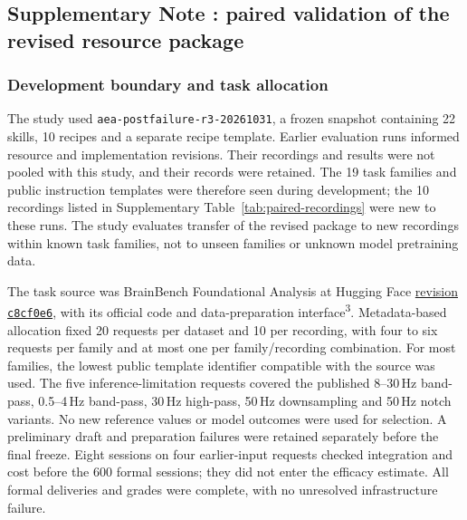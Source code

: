 \FloatBarrier
{}
\subsection*{Supplementary Note \thesuppnote: paired validation of the revised resource package}
\label{si:paired-validation}

\subsubsection*{Development boundary and task allocation}

The study used \texttt{aea-postfailure-r3-20261031}, a frozen snapshot containing 22 skills, 10 recipes and a separate recipe template. Earlier evaluation runs informed resource and implementation revisions. Their recordings and results were not pooled with this study, and their records were retained. The 19 task families and public instruction templates were therefore seen during development; the 10 recordings listed in Supplementary Table~\ref*{tab:paired-recordings} were new to these runs. The study evaluates transfer of the revised package to new recordings within known task families, not to unseen families or unknown model pretraining data.

The task source was BrainBench Foundational Analysis at Hugging Face \href{https://huggingface.co/datasets/xbb083/BrainBench/tree/c8cf0e6fc549d832e0d2de11f6e831b7bcb753a3}{revision \texttt{c8cf0e6}}, with its official code and data-preparation interface\textsuperscript{3}. Metadata-based allocation fixed 20 requests per dataset and 10 per recording, with four to six requests per family and at most one per family/recording combination. For most families, the lowest public template identifier compatible with the source was used. The five inference-limitation requests covered the published 8--30\,Hz band-pass, 0.5--4\,Hz band-pass, 30\,Hz high-pass, 50\,Hz downsampling and 50\,Hz notch variants. No new reference values or model outcomes were used for selection. A preliminary draft and preparation failures were retained separately before the final freeze. Eight sessions on four earlier-input requests checked integration and cost before the 600 formal sessions; they did not enter the efficacy estimate. All formal deliveries and grades were complete, with no unresolved infrastructure failure.

